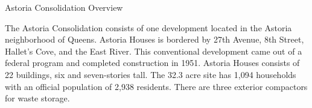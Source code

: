 Astoria Consolidation Overview

The Astoria Consolidation consists of one development located in the Astoria neighborhood of Queens. Astoria Houses is bordered by 27th Avenue, 8th Street, Hallet's Cove, and the East River. This conventional development came out of a federal program and completed construction in 1951. Astoria Houses consists of 22 buildings, six and seven-stories tall. The 32.3 acre site has 1,094 households with an official population of 2,938 residents. There are three exterior compactors for waste storage.